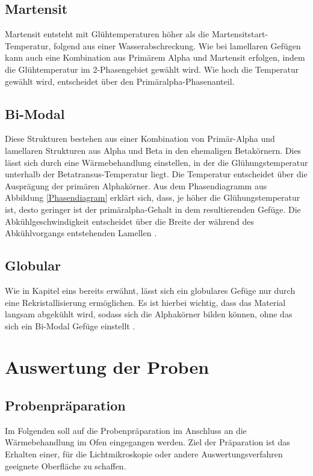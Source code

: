 \documentclass[a4paper, 11pt]{tubsreprt}
\begin{document}
\subsection{Martensit}
Martensit entsteht mit Glühtemperaturen höher als die Martensitstart-Temperatur, folgend aus einer Wasserabschreckung. Wie bei lamellaren Gefügen kann auch eine Kombination aus Primärem Alpha und Martensit erfolgen, indem die Glühtemperatur im 2-Phasengebiet gewählt wird. Wie hoch die Temperatur gewählt wird, entscheidet über den Primäralpha-Phasenanteil.

\subsection{Bi-Modal}
Diese Strukturen bestehen aus einer Kombination von Primär-Alpha und lamellaren Strukturen aus Alpha und Beta in den ehemaligen Betakörnern. Dies lässt sich durch eine Wärmebehandlung einstellen, in der die Glühungstemperatur unterhalb der Betatransus-Temperatur liegt. Die Temperatur entscheidet über die Ausprägung der primären Alphakörner. Aus dem Phasendiagramm aus Abbildung \ref{Phasendiagram} erklärt sich, dass, je höher die Glühungstemperatur ist, desto geringer ist der primäralpha-Gehalt in dem resultierenden Gefüge. Die Abkühlgeschwindigkeit entscheidet über die Breite der während des Abkühlvorgangs entstehenden Lamellen \cite{Luetjering2007}.

\subsection{Globular}
Wie in Kapitel eins bereits erwähnt, lässt sich ein globulares Gefüge nur durch eine Rekristallisierung ermöglichen. Es ist hierbei wichtig, dass das Material langsam abgekühlt wird, sodass sich die Alphakörner bilden können, ohne das sich ein Bi-Modal Gefüge einstellt \cite{Luetjering2007}.

\section{Auswertung der Proben}
\subsection{Probenpräparation}
Im Folgenden soll auf die Probenpräparation im Anschluss an die Wärmebehandlung im Ofen eingegangen werden. Ziel der Präparation ist das Erhalten einer, für die Lichtmikroskopie oder andere Auswertungsverfahren geeignete Oberfläche zu schaffen. 
\end{document}

